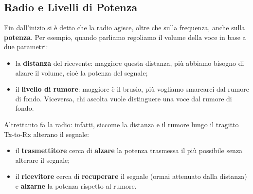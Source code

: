 \documentclass[openany,a4paper,12pt]{book}
\begin{document}
\begin{figure}[H]
\end{figure}

\subsection*{Radio e Livelli di Potenza}

Fin dall'inizio si è detto che la radio agisce, oltre che sulla frequenza, anche sulla \textbf{potenza}. 
Per esempio, quando parliamo regoliamo il volume della voce in base a due parametri:
\begin{itemize}[label=\textcolor{PoliBlue}{\textbullet}]
    \item la \textbf{distanza} del ricevente: maggiore questa distanza, più abbiamo bisogno di alzare il volume, cioè la potenza del segnale;
    \item il \textbf{livello di rumore}: maggiore è il brusio, più vogliamo smarcarci dal rumore di fondo. Viceversa, chi ascolta vuole distinguere una voce dal rumore di fondo.
\end{itemize}

Altrettanto fa la radio: infatti, siccome la distanza e il rumore lungo il tragitto Tx-to-Rx alterano il segnale:
\begin{itemize}[label=\textcolor{PoliBlue}{\textbullet}]
    \item il \textbf{trasmettitore} cerca di \textbf{alzare} la potenza trasmessa il più possibile senza alterare il segnale;
    \item il \textbf{ricevitore} cerca di \textbf{recuperare} il segnale (ormai attenuato dalla distanza) e \textbf{alzarne} la potenza rispetto al rumore.
\end{itemize}
\end{document}
